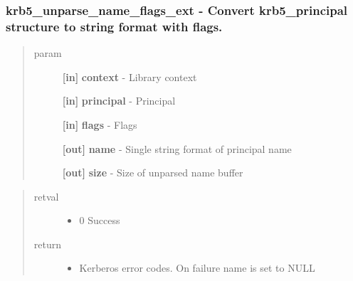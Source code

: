 \documentclass[letterpaper,10pt,english]{sphinxmanual}
\begin{document}
\subsubsection{krb5\_unparse\_name\_flags\_ext -  Convert krb5\_principal structure to string format with flags.}
\label{appdev/refs/api/krb5_unparse_name_flags_ext:krb5-unparse-name-flags-ext-convert-krb5-principal-structure-to-string-format-with-flags}\label{appdev/refs/api/krb5_unparse_name_flags_ext::doc}

\begin{fulllineitems}
\label{appdev/refs/api/krb5_unparse_name_flags_ext:c.krb5_unparse_name_flags_ext}
\end{fulllineitems}

\begin{quote}\begin{description}
\item[{param}] \leavevmode
\textbf{{[}in{]}} \textbf{context} - Library context

\textbf{{[}in{]}} \textbf{principal} - Principal

\textbf{{[}in{]}} \textbf{flags} - Flags

\textbf{{[}out{]}} \textbf{name} - Single string format of principal name

\textbf{{[}out{]}} \textbf{size} - Size of unparsed name buffer

\end{description}\end{quote}
\begin{quote}\begin{description}
\item[{retval}] \leavevmode\begin{itemize}
\item {} 
0   Success

\end{itemize}

\item[{return}] \leavevmode\begin{itemize}
\item {} 
Kerberos error codes. On failure name is set to NULL

\end{itemize}

\end{description}\end{quote}
\end{document}
